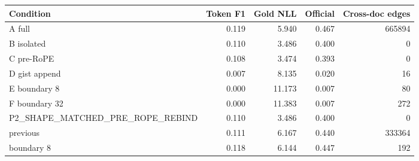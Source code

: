 \begin{tabular}{lrrrr}
\toprule
Condition & Token F1 & Gold NLL & Official & Cross-doc edges \\
\midrule
A full & 0.119 & 5.940 & 0.467 & 665894 \\
B isolated & 0.110 & 3.486 & 0.400 & 0 \\
C pre-RoPE & 0.108 & 3.474 & 0.393 & 0 \\
D gist append & 0.007 & 8.135 & 0.020 & 16 \\
E boundary 8 & 0.000 & 11.173 & 0.007 & 80 \\
F boundary 32 & 0.000 & 11.383 & 0.007 & 272 \\
P2_SHAPE_MATCHED_PRE_ROPE_REBIND & 0.110 & 3.486 & 0.400 & 0 \\
previous & 0.111 & 6.167 & 0.440 & 333364 \\
boundary 8 & 0.118 & 6.144 & 0.447 & 192 \\
\bottomrule
\end{tabular}
